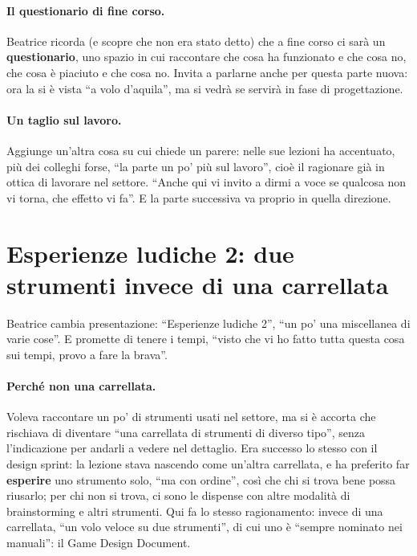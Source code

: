\paragraph{Il questionario di fine corso.} Beatrice ricorda (e scopre che non era
stato detto) che a fine corso ci sarà un \textbf{questionario}, uno spazio in cui
raccontare che cosa ha funzionato e che cosa no, che cosa è piaciuto e che cosa no.
Invita a parlarne anche per questa parte nuova: ora la si è vista ``a volo
d'aquila'', ma si vedrà se servirà in fase di progettazione.

\paragraph{Un taglio sul lavoro.} Aggiunge un'altra cosa su cui chiede un parere: nelle
sue lezioni ha accentuato, più dei colleghi forse, ``la parte un po' più sul lavoro'',
cioè il ragionare già in ottica di lavorare nel settore. ``Anche qui vi invito a dirmi
a voce se qualcosa non vi torna, che effetto vi fa''. E la parte successiva va proprio
in quella direzione.

\section{Esperienze ludiche 2: due strumenti invece di una carrellata}
\label{a9:sec:esperienze2}

Beatrice cambia presentazione: ``Esperienze ludiche 2'', ``un po' una miscellanea di
varie cose''. E promette di tenere i tempi, ``visto che vi ho fatto tutta questa cosa
sui tempi, provo a fare la brava''.

\paragraph{Perché non una carrellata.} Voleva raccontare un po' di strumenti usati nel
settore, ma si è accorta che rischiava di diventare ``una carrellata di strumenti di
diverso tipo'', senza l'indicazione per andarli a vedere nel dettaglio. Era successo lo
stesso con il design sprint: la lezione stava nascendo come un'altra carrellata, e ha
preferito far \textbf{esperire} uno strumento solo, ``ma con ordine'', così che chi si
trova bene possa riusarlo; per chi non si trova, ci sono le dispense con altre
modalità di brainstorming e altri strumenti. Qui fa lo stesso ragionamento: invece di
una carrellata, ``un volo veloce su due strumenti'', di cui uno è ``sempre nominato
nei manuali'': il Game Design Document.

